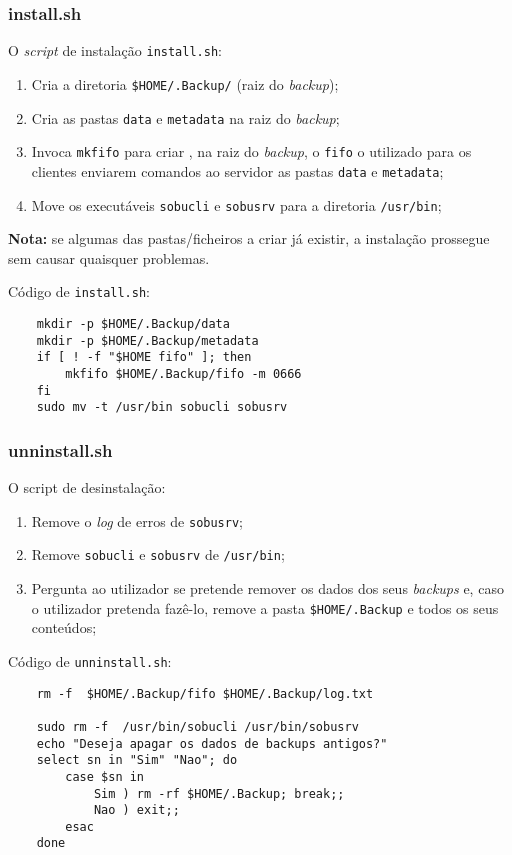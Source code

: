 \documentclass[a4paper,12pt,titlepage,portuguese]{article}
\begin{document}
\newpage
\subsubsection{install.sh}
O \emph{script} de instalação \texttt{install.sh}:
	\begin{enumerate}
		\item Cria a diretoria \texttt{\$HOME/.Backup/} (raiz do \emph{backup});
		\item Cria as pastas \texttt{data} e \texttt{metadata} na raiz do \emph{backup};
		\item Invoca \texttt{mkfifo} para criar , na raiz do \emph{backup}, o \texttt{fifo} o utilizado para os clientes enviarem comandos ao servidor as pastas \texttt{data} e \texttt{metadata};
		\item Move os executáveis \texttt{sobucli} e \texttt{sobusrv} para a diretoria \texttt{/usr/bin};
	\end{enumerate}
\textbf{Nota:} se algumas das pastas/ficheiros a criar já existir, a instalação prossegue sem causar quaisquer problemas. 

Código de \texttt{install.sh}:
	\begin{verbatim}
	mkdir -p $HOME/.Backup/data
	mkdir -p $HOME/.Backup/metadata
	if [ ! -f "$HOME fifo" ]; then
		mkfifo $HOME/.Backup/fifo -m 0666
	fi
	sudo mv -t /usr/bin sobucli sobusrv
	\end{verbatim}

\subsubsection{unninstall.sh}
O script de desinstalação:
	\begin{enumerate}
		\item Remove o \emph{log} de erros de \texttt{sobusrv};
		\item Remove \texttt{sobucli} e \texttt{sobusrv} de \texttt{/usr/bin};
		\item Pergunta ao utilizador se pretende remover os dados dos seus \emph{backups} e, caso o utilizador pretenda fazê-lo, remove a pasta \texttt{\$HOME/.Backup} e todos os seus conteúdos;
	\end{enumerate}

Código de \texttt{unninstall.sh}:
	\begin{verbatim}
	rm -f  $HOME/.Backup/fifo $HOME/.Backup/log.txt

	sudo rm -f  /usr/bin/sobucli /usr/bin/sobusrv 
	echo "Deseja apagar os dados de backups antigos?"
	select sn in "Sim" "Nao"; do
	    case $sn in
	        Sim ) rm -rf $HOME/.Backup; break;;
	        Nao ) exit;;
	    esac
	done
	\end{verbatim}
\end{document}
